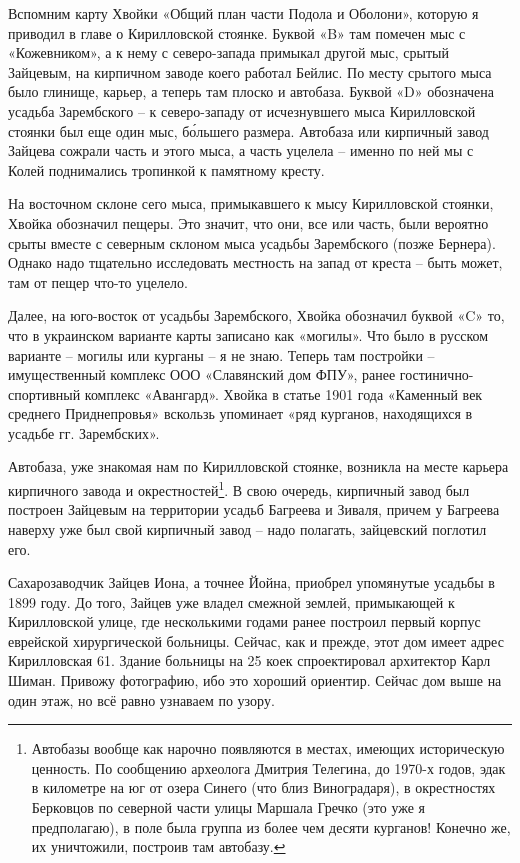 Вспомним карту Хвойки «Общий план части Подола и Оболони», которую я приводил в главе о Кирилловской стоянке. Буквой «B» там помечен мыс с «Кожевником», а к нему с северо-запада примыкал другой мыс, срытый Зайцевым, на кирпичном заводе коего работал Бейлис. По месту срытого мыса было глинище, карьер, а теперь там плоско и автобаза. Буквой «D» обозначена усадьба Зарембского – к северо-западу от исчезнувшего мыса Кирилловской стоянки был еще один мыс, б\'ольшего размера. Автобаза или кирпичный завод Зайцева сожрали часть и этого мыса, а часть уцелела – именно по ней мы с Колей поднимались тропинкой к памятному кресту.

На восточном склоне сего мыса, примыкавшего к мысу Кирилловской стоянки, Хвойка обозначил пещеры. Это значит, что они, все или часть, были вероятно срыты вместе с северным склоном мыса усадьбы Зарембского (позже Бернера). Однако надо тщательно исследовать местность на запад от креста – быть может, там от пещер что-то уцелело.

Далее, на юго-восток от усадьбы Зарембского, Хвойка обозначил буквой «C» то, что в украинском варианте карты записано как «могилы». Что было в русском варианте – могилы или курганы – я не знаю. Теперь там постройки – имущественный комплекс ООО «Славянский дом ФПУ», ранее гостинично-спортивный комплекс «Авангард». Хвойка в статье 1901 года «Каменный век среднего Приднепровья» вскользь упоминает «ряд курганов, находящихся в усадьбе гг. Зарембских».

Автобаза, уже знакомая нам по Кирилловской стоянке, возникла на месте карьера кирпичного завода и окрестностей\footnote{Автобазы вообще как нарочно появляются в местах, имеющих историческую ценность. По сообщению археолога Дмитрия Телегина\cite{telegin01}, до 1970-х годов, эдак в километре на юг от озера Синего (что близ Виноградаря), в окрестностях Берковцов по северной части улицы Маршала Гречко (это уже я предполагаю), в поле была группа из более чем десяти курганов! Конечно же, их уничтожили, построив там автобазу.}. В свою очередь, кирпичный завод был построен Зайцевым на территории усадьб Багреева и Зиваля, причем у Багреева наверху уже был свой кирпичный завод – надо полагать, зайцевский поглотил его.

Сахарозаводчик Зайцев Иона, а точнее Йойна, приобрел упомянутые усадьбы в 1899 году. До того, Зайцев уже владел смежной землей, примыкающей к Кирилловской улице, где несколькими годами ранее построил первый корпус еврейской хирургической больницы. Сейчас, как и прежде, этот дом имеет адрес Кирилловская 61. Здание больницы на 25 коек спроектировал архитектор Карл Шиман. Привожу фотографию, ибо это хороший ориентир. Сейчас дом выше на один этаж, но всё равно узнаваем по узору.

